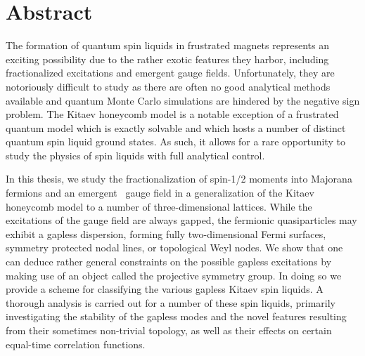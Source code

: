 \chapter*{Abstract}
%
%
The formation of quantum spin liquids in frustrated magnets represents an exciting possibility due to the rather exotic features they harbor, including fractionalized excitations and emergent gauge fields.
Unfortunately, they are notoriously difficult to study as there are often no good analytical methods available and quantum Monte Carlo simulations are hindered by the negative sign problem.
The Kitaev honeycomb model is a notable exception of a frustrated quantum model which is exactly solvable and which hosts a number of distinct quantum spin liquid ground states.
As such, it allows for a rare opportunity to study the physics of spin liquids with full analytical control.

In this thesis, we study the fractionalization of spin-1/2 moments into Majorana fermions and an emergent \ZZ~gauge field in a generalization of the Kitaev honeycomb model to a number of three-dimensional lattices.
While the excitations of the gauge field are always gapped, the fermionic quasiparticles may exhibit a gapless dispersion, forming fully two-dimensional Fermi surfaces, symmetry protected nodal lines, or topological Weyl nodes.
We show that one can deduce rather general constraints on the possible gapless excitations by making use of an object called the projective symmetry group.
In doing so we provide a scheme for classifying the various gapless Kitaev spin liquids.
A thorough analysis is carried out for a number of these spin liquids, primarily investigating the stability of the gapless modes and the novel features resulting from their sometimes non-trivial topology, as well as their effects on certain equal-time correlation functions.